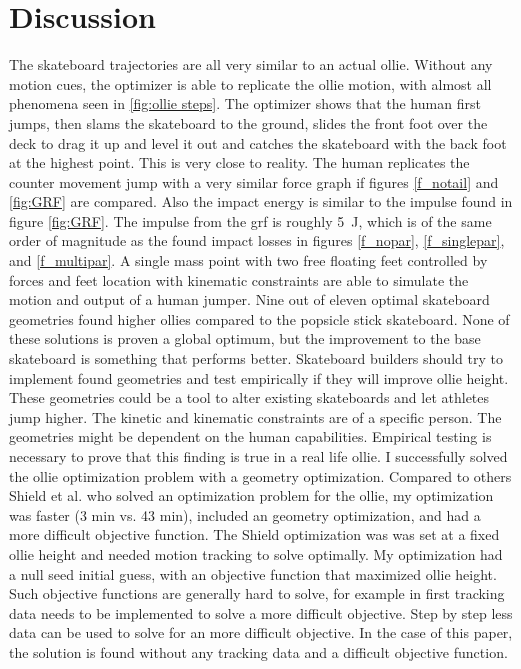 \documentclass[default,iicol]{sn-jnl}
\begin{document}
\section{Discussion}
\noindent The skateboard trajectories are all very similar to an actual ollie. Without any motion cues, the optimizer is able to replicate the ollie motion, with almost all phenomena seen in \ref{fig:ollie steps}. The optimizer shows that the human first jumps, then slams the skateboard to the ground, slides the front foot over the deck to drag it up and level it out and catches the skateboard with the back foot at the highest point. This is very close to reality. The human replicates the counter movement jump with a very similar force graph if figures \ref{f_notail} and \ref{fig:GRF} are compared. Also the impact energy is similar to the impulse found in figure \ref{fig:GRF}. The impulse from the \gls{grf} is roughly \SI{5}{\joule}, which is of the same order of magnitude as the found impact losses in figures \ref{f_nopar}, \ref{f_singlepar}, and \ref{f_multipar}.
A single mass point with two free floating feet controlled by forces and feet location with kinematic constraints are able to simulate the motion and output of a human jumper. 
Nine out of eleven optimal skateboard geometries found higher ollies compared to the popsicle stick skateboard. None of these solutions is proven a global optimum, but the improvement to the base skateboard is something that performs better. Skateboard builders should try to implement found geometries and test empirically if they will improve ollie height. These geometries could be a tool to alter existing skateboards and let athletes jump higher. The kinetic and kinematic constraints are of a specific person. The geometries might be dependent on the human capabilities. Empirical testing is necessary to prove that this finding is true in a real life ollie. I successfully solved the ollie optimization problem with a geometry optimization. Compared to others Shield et al. \cite{shield_contact-implicit_2022} who solved an optimization problem for the ollie, my optimization was faster (3 min vs. 43 min), included an geometry optimization, and had a more difficult objective function. The Shield optimization was was set at a fixed ollie height and needed motion tracking to solve optimally. My optimization had a null seed initial guess, with an objective function that maximized ollie height. Such objective functions are generally hard to solve, for example in \cite{nitschke_efficient_2020} first tracking data needs to be implemented to solve a more difficult objective. Step by step less data can be used to solve for an more difficult objective. In the case of this paper, the solution is found without any tracking data and a difficult objective function. 
\end{document}
